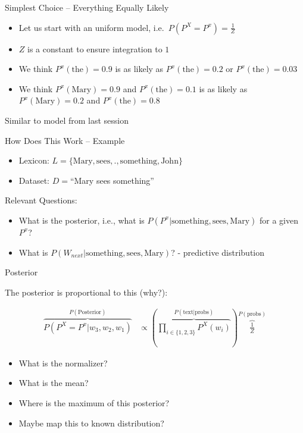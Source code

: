 \documentclass[11pt]{beamer}
\begin{document}
	\begin{frame}{Simplest Choice -- Everything Equally Likely}
		\begin{itemize}
			\item Let us start with an uniform model, i.e.\ $P\left( P^X = P^{x} \right) = \frac{1}{Z}$
			\item $Z$ is a constant to ensure integration to $1$
			\item We think $P^{x}(\text{the}) = 0.9$ is as likely as $P^{x}(\text{the}) = 0.2$ or $P^{x}(\text{the}) = 0.03$
			\item We think $P^{x}(\text{Mary}) = 0.9$ and $P^{x}(\text{the}) = 0.1$ is as likely as $P^{x}(\text{Mary}) = 0.2$ and $P^{x}(\text{the}) = 0.8$
		\end{itemize}
		
		\vspace{10pt}Similar to model from last session
	\end{frame}
	
	\begin{frame}{How Does This Work -- Example}
		\begin{itemize}
			\item<1-> Lexicon: $L = \lbrace \text{Mary}, \text{sees}, \text{.}, \text{something}, \text{John}  \rbrace$
			\item<1-> Dataset: $D=$``Mary sees something''
		\end{itemize}
		
		\vspace{10pt} Relevant Questions:
		
		\begin{itemize}
			\item<2-> What is the posterior, i.e., what is $P(P^x | \text{something},\text{sees},\text{Mary})$ for a given $P^x$?
			\item<3-> What is $P(W_{next} | \text{something},\text{sees},\text{Mary})$? - predictive distribution
		\end{itemize}
	\end{frame}
	
	\begin{frame}{Posterior}
	
		The posterior is proportional to this (why?):
	
		\begin{align*}
			\overbrace{P(P^X = P^x \vert w_3,w_2,w_1)}^{P(\text{Posterior})} & \propto \left(\overbrace{\prod_{i \in \{1,2,3\}} P^{X}(w_i)}^{P(\text{text}|\text{probs})}\right) \overbrace{\frac{1}{Z}}^{P(\text{probs})}
		\end{align*}
		
		\vspace{10pt}
		\begin{itemize}
			\item<2-> What is the normalizer?
			\item<2-> What is the mean?
			\item<2-> Where is the maximum of this posterior?
			\item<3-> Maybe map this to known distribution?
		\end{itemize}
	\end{frame}
	
\end{document}
